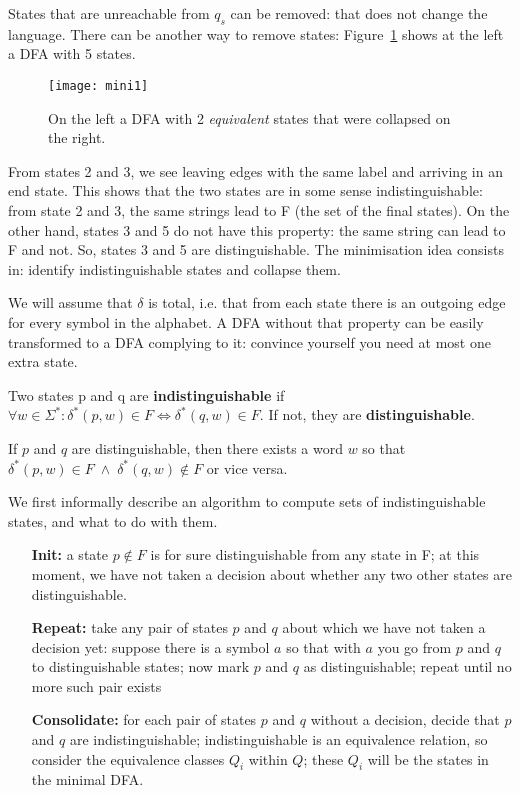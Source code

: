 States that are unreachable from $q_s$ can be removed: that does not
change the language. There can be another way to remove states:
Figure~\ref{mini1} shows at the left a DFA with 5 states.

\begin{figure}[h]
	\centering
	\texttt{[image: mini1]}
	\caption{ On the left a DFA with 2 {\em equivalent} states that were collapsed on the right.\label{mini1}}
\end{figure}

From states 2 and 3, we see leaving edges with the same label and
arriving in an end state. This shows that the two states are in some
sense indistinguishable: from state 2 and 3, the same strings lead to
F (the set of the final states). On the other hand, states 3 and 5 do not have this property: the
same string can lead to F and not. So, states 3 and 5 are
distinguishable. The minimisation idea consists in: identify
indistinguishable states and collapse them.

We will assume that $\delta$ is total, i.e. that from each state there
is an outgoing edge for every symbol in the alphabet. A DFA without
that property can be easily transformed to a DFA complying to it:
convince yourself you need at most one extra state.

\begin{definition} \label{gelijk}
Two states p and q are {\bf indistinguishable} if
$\forall w \in \Sigma^*: \delta^*(p,w) \in F \Longleftrightarrow \delta^*(q,w) \in F$. If not, they are {\bf distinguishable}.
\end{definition}

If $p$ and $q$ are distinguishable, then there exists a word $w$ so that $\delta^*(p,w) \in F \;\wedge\; \delta^*(q,w) \notin F$ or vice versa.

We first informally describe an algorithm to compute sets of
indistinguishable states, and what to do with them.

\begin{itemize}
\item[{\bf Init:}]
a state $p \notin F$ is for sure distinguishable from any state in
F; at this moment, we have not taken a decision about whether any two other states are distinguishable.

\item[{\bf Repeat:}]
take any pair of states $p$ and $q$ about which we have not taken a
decision yet: suppose there is a symbol $a$ so that with $a$ you go
from $p$ and $q$ to distinguishable states; now mark $p$ and $q$ as
distinguishable; repeat until no more such pair exists

\item[{\bf Consolidate:}]
for each pair of states $p$ and $q$ without a decision, decide that
$p$ and $q$ are indistinguishable; indistinguishable is an equivalence
relation, so consider the equivalence classes $Q_i$ within $Q$; these
$Q_i$ will be the states in the minimal DFA.
\end{itemize}

